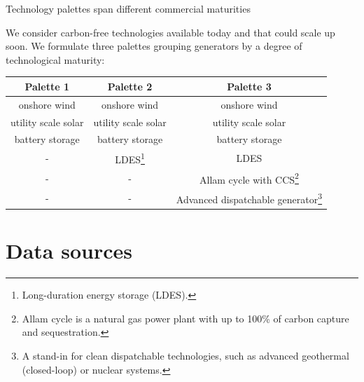 \begin{frame}{Technology palettes span different commercial maturities}

  {\small

  We consider carbon-free technologies available today and that could scale up soon.
  We formulate \alert{three palettes} grouping generators by a degree of technological
  maturity:

  \centering
  \begin{table}[h]
  \begin{tabular}{ccc}
    \hline
    \alert{Palette 1} & \alert{Palette 2} &  \alert{Palette 3} \\
    \hline
      onshore wind & onshore wind  & onshore wind \\
    \hline
      utility scale solar & utility scale solar  & utility scale solar \\
    \hline
      battery storage & battery storage  & battery storage \\
    \hline
      - & LDES\footnote{{\scriptsize Long-duration energy storage (LDES).}} & LDES \\
    \hline
      - & - & Allam cycle with CCS\footnote{{\scriptsize Allam cycle is a natural gas power plant
      with up to 100\% of carbon capture and sequestration.}}  \\
    \hline
      - & - & Advanced dispatchable generator\footnote{{\scriptsize A stand-in for clean dispatchable technologies,
      such as advanced geothermal (closed-loop) or nuclear systems.}} \\
  \end{tabular}
  \end{table}
  }
  \vspace{0.5cm}

\end{frame}


\section{Data sources}


